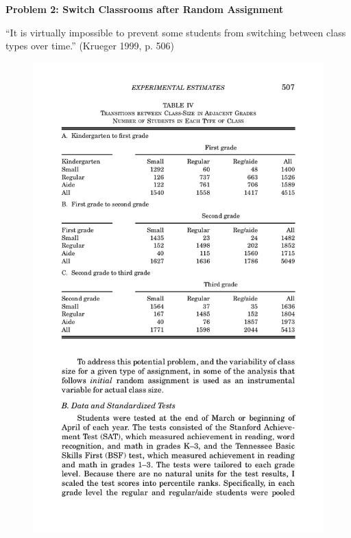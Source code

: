 \documentclass{beamer}
\begin{document}
\begin{frame}[plain]
	\begin{center}
	\textbf{Problem 2: Switch Classrooms after Random Assignment}
	\end{center}

``It is virtually impossible to prevent some students from switching between class types over time.'' (Krueger 1999, p. 506)
	\begin{figure}
	\includegraphics[scale=0.6]{./lecture_includes/krueger1999_table4.pdf}
	\end{figure}


\end{frame}
\end{document}
